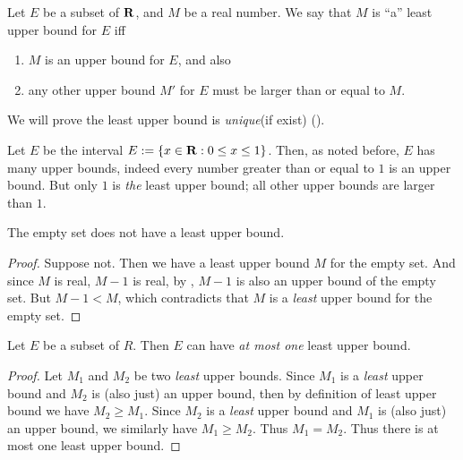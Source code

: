 \begin{definition}  \label{definition 5.5.5}
Let \(E\) be a subset of \(\mathbf{R}\), and \(M\) be a real number.
We say that \(M\) is ``a'' least upper bound for \(E\) iff
\begin{enumerate}
    \item \(M\) is an upper bound for \(E\), and also
    \item any other upper bound \(M'\) for \(E\) must be larger than or equal to \(M\).
\end{enumerate}
\end{definition}

\begin{note}
We will prove the least upper bound is \emph{unique}(if exist) ().
\end{note}

\begin{example} \label{example 5.5.6}
Let \(E\) be the interval \(E := \{x \in \mathbf{R} : 0 \le x \le 1 \} \).
Then, as noted before, \(E\) has many upper bounds, indeed every number greater than or equal to \(1\) is an upper bound.
But only \(1\) is \emph{the} least upper bound;
all other upper bounds are larger than \(1\).
\end{example}

\begin{example} \label{example 5.5.7}
The empty set does not have a least upper bound.
\end{example}

\begin{proof}
Suppose not.
Then we have a least upper bound \(M\) for the empty set.
And since \(M\) is real, \(M - 1\) is real, by , \(M - 1\) is also an upper bound of the empty set.
But \(M - 1 < M\), which contradicts that \(M\) is a \emph{least} upper bound for the empty set.
\end{proof}

\begin{proposition}  \label{prop 5.5.8}
Let \(E\) be a subset of \(R\).
Then \(E\) can have \emph{at most one} least upper bound.
\end{proposition}

\begin{proof}
Let \(M_1\) and \(M_2\) be two \emph{least} upper bounds.
Since \(M_1\) is a \emph{least} upper bound and \(M_2\) is (also just) an upper bound, then by definition of least upper bound we have \(M_2 \ge M_1\).
Since \(M_2\) is a \emph{least} upper bound and \(M_1\) is (also just) an upper bound, we similarly have \(M_1 \ge M_2\).
Thus \(M_1 = M_2\).
Thus there is at most one least upper bound.
\end{proof}

